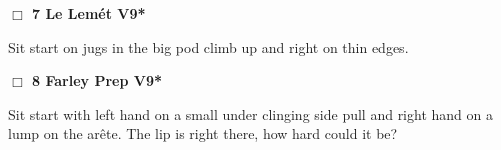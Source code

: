 \begin{multicols}{2}
\needspace{2em}
\label{rt:Le Lemét}
\colorbox{Goldenrod!20}{
\parbox{0.95\linewidth}{
\hspace{-1ex}\textbf{$\Box$
7 Le Lemét V9*  
}}}
\begin{adjustwidth}{1.3em}{}			

Sit start on jugs in the big pod climb up and right on thin edges.
\end{adjustwidth}




\needspace{2em}
\label{rt:Farley Prep}
\colorbox{Goldenrod!20}{
\parbox{0.95\linewidth}{
\hspace{-1ex}\textbf{$\Box$
8 Farley Prep V9*  
}}}
\begin{adjustwidth}{1.3em}{}			

Sit start with left hand on a small under clinging side pull and right hand on a lump on the arête. The lip is right there, how hard could it be?
\end{adjustwidth}






\end{multicols}
\clearpage
